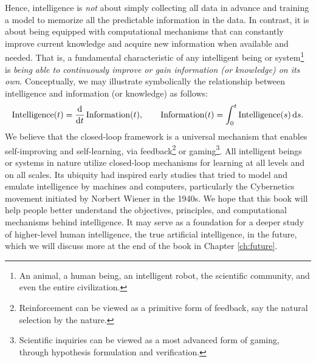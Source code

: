 \documentclass[../../book-main.tex]{subfiles}
\begin{document}
Hence, intelligence is {\em not} about simply collecting all data in advance and training a model to memorize all the predictable information in the data. In contrast, it is about being equipped with computational mechanisms that can constantly improve current knowledge and acquire new information when available and needed. That is, a fundamental characteristic of any intelligent being or system\footnote{An animal, a human being, an intelligent robot, the scientific community, and even the entire civilization.} is {\em being able to continuously improve or gain information (or knowledge) on its own}. Conceptually, we may illustrate symbolically the relationship between intelligence and information (or knowledge) as follows:
\begin{equation}
\operatorname{Intelligence}(t) = \odv*{\operatorname{Information}}{t}(t), \qquad 
\operatorname{Information}(t)  = \int_0^t \operatorname{Intelligence}(s) \odif{s}.
\end{equation}
We believe that the closed-loop framework is a universal mechanism that enables self-improving and self-learning, via feedback\footnote{Reinforcement can be viewed as a primitive form of feedback, say the natural selection by the nature.} or gaming\footnote{Scientific inquiries can be viewed as a most advanced form of gaming, through hypothesis formulation and verification.}. All intelligent beings or systems in nature utilize closed-loop mechanisms for learning at all levels and on all scales. Its ubiquity had inspired early studies that tried to model and emulate intelligence by machines and computers, particularly the Cybernetics movement initiated by Norbert Wiener in the 1940s. We hope that this book will help people better understand the objectives, principles, and computational mechanisms behind intelligence. It may serve as a foundation for a deeper study of higher-level human intelligence, the true artificial intelligence, in the future, which we will discuss more at the end of the book in Chapter \ref{ch:future}.
\end{document}
